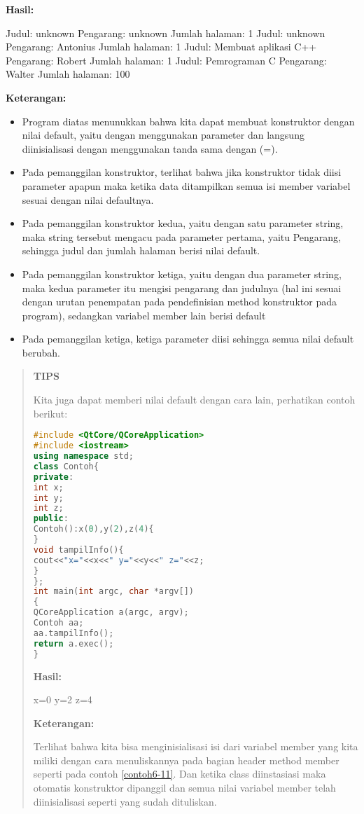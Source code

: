 \textbf{Hasil:}

\begin{lcverbatim}
Judul: unknown
Pengarang: unknown
Jumlah halaman: 1
Judul: unknown
Pengarang: Antonius
Jumlah halaman: 1
Judul: Membuat aplikasi C++
Pengarang: Robert
Jumlah halaman: 1
Judul: Pemrograman C
Pengarang: Walter
Jumlah halaman: 100
\end{lcverbatim}
\textbf{Keterangan:}

\begin{itemize}

\item
  Program diatas menunukkan bahwa kita dapat membuat konstruktor dengan
  nilai default, yaitu dengan menggunakan parameter dan langsung
  diinisialisasi dengan menggunakan tanda sama dengan (=).
\item
  Pada pemanggilan konstruktor, terlihat bahwa jika konstruktor tidak
  diisi parameter apapun maka ketika data ditampilkan semua isi member
  variabel sesuai dengan nilai defaultnya.
\item
  Pada pemanggilan konstruktor kedua, yaitu dengan satu parameter
  string, maka string tersebut mengacu pada parameter pertama, yaitu
  Pengarang, sehingga judul dan jumlah halaman berisi nilai default.
\item
  Pada pemanggilan konstruktor ketiga, yaitu dengan dua parameter
  string, maka kedua parameter itu mengisi pengarang dan judulnya (hal
  ini sesuai dengan urutan penempatan pada pendefinisian method
  konstruktor pada program), sedangkan variabel member lain berisi
  default
\item
  Pada pemanggilan ketiga, ketiga parameter diisi sehingga semua nilai
  default berubah.
\end{itemize}
\begin{quotation}
{\LARGE {}} 	\textbf{TIPS} 
	
	Kita juga
	dapat memberi nilai default dengan cara lain, perhatikan contoh berikut:
	
\begin{lstlisting}[language=c++, caption=Memberi nilai default pada constructor, label=contoh6-11]
#include <QtCore/QCoreApplication>
#include <iostream>
using namespace std;
class Contoh{
private:
int x;
int y;
int z;
public:
Contoh():x(0),y(2),z(4){
}
void tampilInfo(){
cout<<"x="<<x<<" y="<<y<<" z="<<z;
}
};
int main(int argc, char *argv[])
{
QCoreApplication a(argc, argv);
Contoh aa;
aa.tampilInfo();
return a.exec();
}
\end{lstlisting}
	
	\textbf{Hasil:}
	
\begin{lcverbatim}
x=0 y=2 z=4
\end{lcverbatim}
	
	\textbf{Keterangan:}
	
	Terlihat bahwa kita bisa menginisialisasi isi dari variabel member yang
	kita miliki dengan cara menuliskannya pada bagian header method member
	seperti pada contoh \ref{contoh6-11}. Dan ketika class diinstasiasi maka otomatis
	konstruktor dipanggil dan semua nilai variabel member telah
	diinisialisasi seperti yang sudah dituliskan.
\end{quotation}


